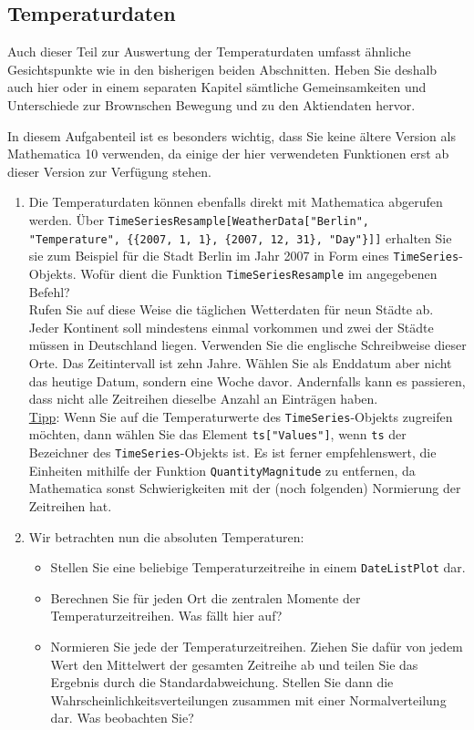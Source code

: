 \documentclass[a4paper,10pt]{article}
\begin{document}
\subsection{Temperaturdaten}
Auch dieser Teil zur Auswertung der Temperaturdaten umfasst ähnliche Gesichtspunkte wie in den bisherigen beiden Abschnitten. Heben Sie deshalb auch hier oder in einem separaten Kapitel sämtliche Gemeinsamkeiten und Unterschiede zur Brownschen Bewegung und zu den Aktiendaten hervor. 

In diesem Aufgabenteil ist es besonders wichtig, dass Sie keine ältere Version als Mathematica 10 verwenden, da einige der hier verwendeten Funktionen erst ab dieser Version zur Verfügung stehen.

\begin{enumerate}
 \item Die Temperaturdaten können ebenfalls direkt mit Mathematica abgerufen werden. Über \texttt{TimeSeriesResample[WeatherData["Berlin", "Temperature", \{\{2007, 1, 1\}, \{2007, 12, 31\}, "Day"\}]]} erhalten Sie sie zum Beispiel für die Stadt Berlin im Jahr 2007 in Form eines \texttt{TimeSeries}-Objekts. Wofür dient die Funktion \texttt{TimeSeriesResample} im angegebenen Befehl? \\
 Rufen Sie auf diese Weise die täglichen Wetterdaten für neun Städte ab. Jeder Kontinent soll mindestens einmal vorkommen und zwei der Städte müssen in Deutschland liegen. Verwenden Sie die englische Schreibweise dieser Orte. Das Zeitintervall ist zehn Jahre. Wählen Sie als Enddatum aber nicht das heutige Datum, sondern eine Woche davor. Andernfalls kann es passieren, dass nicht alle Zeitreihen dieselbe Anzahl an Einträgen haben. \\
 \uline{Tipp}: Wenn Sie auf die Temperaturwerte des \texttt{TimeSeries}-Objekts zugreifen möchten, dann wählen Sie das Element \texttt{ts["Values"]}, wenn \texttt{ts} der Bezeichner des \texttt{TimeSeries}-Objekts ist. Es ist ferner empfehlenswert, die Einheiten mithilfe der Funktion \texttt{QuantityMagnitude} zu entfernen, da Mathematica sonst Schwierigkeiten mit der (noch folgenden) Normierung der Zeitreihen hat.
 \item Wir betrachten nun die absoluten Temperaturen:
 \begin{itemize}
  \item Stellen Sie eine beliebige Temperaturzeitreihe in einem \texttt{DateListPlot} dar.
  \item Berechnen Sie für jeden Ort die zentralen Momente der Temperaturzeitreihen. Was fällt hier auf?
  \item Normieren Sie jede der Temperaturzeitreihen. Ziehen Sie dafür von jedem Wert den Mittelwert der gesamten Zeitreihe ab und teilen Sie das Ergebnis durch die Standardabweichung. Stellen Sie dann die Wahrscheinlichkeitsverteilungen zusammen mit einer Normalverteilung dar. Was beobachten Sie?

\end{itemize}
\end{enumerate}
\end{document}
